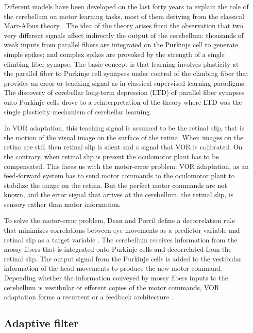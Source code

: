 \documentclass[doc,apacite,a4paper]{apa6}
\begin{document}
Different models have been developed on the last forty years to explain the role of the cerebellum on motor learning tasks, most of them deriving from the classical Marr-Albus theory \cite{Marr1969,Albus1971}. The idea of the theory arises from the observation that two very different signals affect indirectly the output of the cerebellum: thousands of weak inputs from parallel fibers are integrated on the Purkinje cell to generate simple spikes; and complex spikes are provoked by the strength of a single climbing fiber synapse. The basic concept is that learning involves plasticity at the parallel fiber to Purkinje cell synapses under control of the climbing fiber that provides an error or teaching signal as in classical supervised learning paradigms. The discovery of cerebellar long-term depression (LTD) of parallel fiber synapses onto Purkinje cells \cite{Ito1982} drove to a reinterpretation of the theory where LTD was the single plasticity mechanism of cerebellar learning.

In VOR adaptation, this teaching signal is assumed to be the retinal slip, that is the motion of the visual image on the surface of the retina. When images on the retina are still then retinal slip is silent and a signal that VOR is calibrated. On the contrary, when retinal slip is present the oculomotor plant has to be compensated. This faces us with the motor-error problem: VOR adaptation, as an feed-forward system has to send motor commands to the oculomotor plant to stabilize the image on the retina. But the perfect motor commands are not known, and the error signal that arrives at the cerebellum, the retinal slip, is sensory rather than motor information.

To solve the motor-error problem, Dean and Porril define a decorrelation rule that minimizes correlations between eye movements as a predictor variable and retinal slip as a target variable \cite{Dean2002}. The cerebellum receives information from the mossy fibers that is integrated onto Purkinje cells and decorrelated from the retinal slip. The output signal from the Purkinje cells is added to the vestibular information of the head movements to produce the new motor command. Depending whether the information conveyed by mossy fibers inputs to the cerebellum is vestibular or efferent copies of the motor commands, VOR adaptation forms a recurrent or a feedback architecture \cite{Porrill2004}.

\subsection{Adaptive filter}
\end{document}
